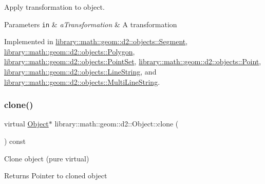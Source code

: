 Apply transformation to object. 


\begin{DoxyParams}[1]{Parameters}
\mbox{\tt in}  & {\em a\+Transformation} & A transformation \\
\hline
\end{DoxyParams}


Implemented in \hyperlink{classlibrary_1_1math_1_1geom_1_1d2_1_1objects_1_1_segment_a5cb71beeb4de3c2c1b84fbfb8546c935}{library\+::math\+::geom\+::d2\+::objects\+::\+Segment}, \hyperlink{classlibrary_1_1math_1_1geom_1_1d2_1_1objects_1_1_polygon_a920b30eb110c7164f65754979da17638}{library\+::math\+::geom\+::d2\+::objects\+::\+Polygon}, \hyperlink{classlibrary_1_1math_1_1geom_1_1d2_1_1objects_1_1_point_set_acfb8652fd1f17f101e7750a0b81452c0}{library\+::math\+::geom\+::d2\+::objects\+::\+Point\+Set}, \hyperlink{classlibrary_1_1math_1_1geom_1_1d2_1_1objects_1_1_point_a71d3ef79dbffcd2568d1a2c6bad807d7}{library\+::math\+::geom\+::d2\+::objects\+::\+Point}, \hyperlink{classlibrary_1_1math_1_1geom_1_1d2_1_1objects_1_1_line_string_abd9e77eb0e1d319e8f9af23ccb6dc0b4}{library\+::math\+::geom\+::d2\+::objects\+::\+Line\+String}, and \hyperlink{classlibrary_1_1math_1_1geom_1_1d2_1_1objects_1_1_multi_line_string_a6180a8b94ff175d6313a74ad4e680bc7}{library\+::math\+::geom\+::d2\+::objects\+::\+Multi\+Line\+String}.

\mbox{\label{classlibrary_1_1math_1_1geom_1_1d2_1_1_object_a5c26ae4120edb24f6463d65a9cef247d}} 
\subsubsection{\texorpdfstring{clone()}{clone()}}
{\footnotesize\ttfamily virtual \hyperlink{classlibrary_1_1math_1_1geom_1_1d2_1_1_object}{Object}$\ast$ library\+::math\+::geom\+::d2\+::\+Object\+::clone (\begin{DoxyParamCaption}{ }\end{DoxyParamCaption}) const\hspace{0.3cm}{\ttfamily [pure virtual]}}



Clone object (pure virtual) 

\begin{DoxyReturn}{Returns}
Pointer to cloned object 
\end{DoxyReturn}


